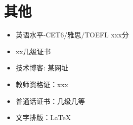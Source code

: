 \documentclass[11pt]{article}
\begin{document}
    \section{\makebox[\widthof{\faInfo}][c]{\color{SYSU_Green}{\faInfo}}\quad 其他}
    \begin{itemize}
        \item 英语水平-CET6/雅思/TOEFL xxx分
        \item xx几级证书
        \item 技术博客: 某网址
        \item 教师资格证：xxx
        \item 普通话证书：几级几等
        \item 文字排版：\LaTeX
    \end{itemize}
\end{document}
